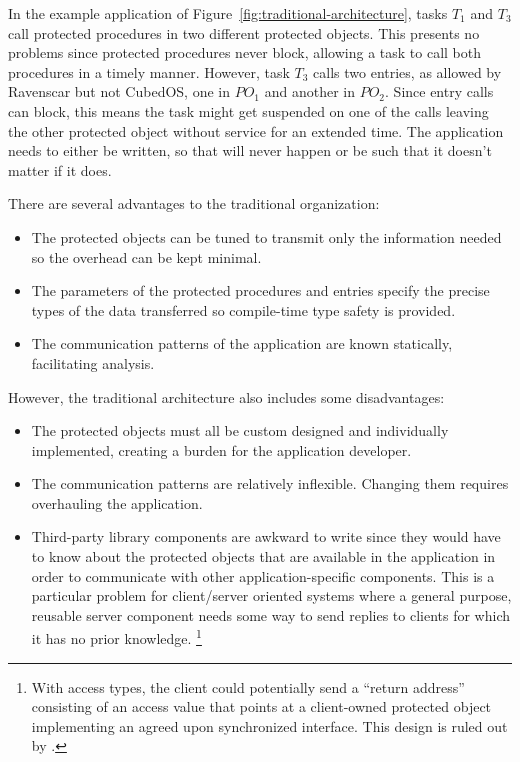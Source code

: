 In the example application of Figure~\ref{fig:traditional-architecture}, tasks $T_1$ and $T_3$
call protected procedures in two different protected objects. This presents no problems since
protected procedures never block, allowing a task to call both procedures in a timely manner.
However, task $T_3$ calls two entries, as allowed by Ravenscar but not CubedOS, one in $PO_1$
and another in $PO_2$. Since entry calls can block, this means the task might get suspended on
one of the calls leaving the other protected object without service for an extended time. The
application needs to either be written, so that will never happen or be such that it doesn't
matter if it does.

There are several advantages to the traditional organization:

\begin{itemize}
\item The protected objects can be tuned to transmit only the information needed so the overhead
  can be kept minimal.
\item The parameters of the protected procedures and entries specify the precise types of the
  data transferred so compile-time type safety is provided.
\item The communication patterns of the application are known statically, facilitating analysis.
\end{itemize}

However, the traditional architecture also includes some disadvantages:

\begin{itemize}
\item The protected objects must all be custom designed and individually implemented, creating a
  burden for the application developer.
\item The communication patterns are relatively inflexible. Changing them requires overhauling
  the application.
\item Third-party library components are awkward to write since they would have to know about
  the protected objects that are available in the application in order to communicate with other
  application-specific components. This is a particular problem for client/server oriented
  systems where a general purpose, reusable server component needs some way to send replies to
  clients for which it has no prior knowledge. \footnote{With access types, the client could
    potentially send a ``return address'' consisting of an access value that points at a
    client-owned protected object implementing an agreed upon synchronized interface. This design
    is ruled out by \SPARK.}
\end{itemize}

